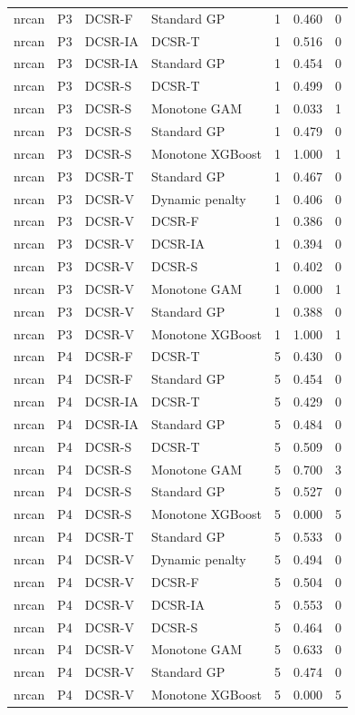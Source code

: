 \begin{tabular}{llllrrr}
nrcan & P3 & DCSR-F & Standard GP & 1 & 0.460 & 0 \\
nrcan & P3 & DCSR-IA & DCSR-T & 1 & 0.516 & 0 \\
nrcan & P3 & DCSR-IA & Standard GP & 1 & 0.454 & 0 \\
nrcan & P3 & DCSR-S & DCSR-T & 1 & 0.499 & 0 \\
nrcan & P3 & DCSR-S & Monotone GAM & 1 & 0.033 & 1 \\
nrcan & P3 & DCSR-S & Standard GP & 1 & 0.479 & 0 \\
nrcan & P3 & DCSR-S & Monotone XGBoost & 1 & 1.000 & 1 \\
nrcan & P3 & DCSR-T & Standard GP & 1 & 0.467 & 0 \\
nrcan & P3 & DCSR-V & Dynamic penalty & 1 & 0.406 & 0 \\
nrcan & P3 & DCSR-V & DCSR-F & 1 & 0.386 & 0 \\
nrcan & P3 & DCSR-V & DCSR-IA & 1 & 0.394 & 0 \\
nrcan & P3 & DCSR-V & DCSR-S & 1 & 0.402 & 0 \\
nrcan & P3 & DCSR-V & Monotone GAM & 1 & 0.000 & 1 \\
nrcan & P3 & DCSR-V & Standard GP & 1 & 0.388 & 0 \\
nrcan & P3 & DCSR-V & Monotone XGBoost & 1 & 1.000 & 1 \\
nrcan & P4 & DCSR-F & DCSR-T & 5 & 0.430 & 0 \\
nrcan & P4 & DCSR-F & Standard GP & 5 & 0.454 & 0 \\
nrcan & P4 & DCSR-IA & DCSR-T & 5 & 0.429 & 0 \\
nrcan & P4 & DCSR-IA & Standard GP & 5 & 0.484 & 0 \\
nrcan & P4 & DCSR-S & DCSR-T & 5 & 0.509 & 0 \\
nrcan & P4 & DCSR-S & Monotone GAM & 5 & 0.700 & 3 \\
nrcan & P4 & DCSR-S & Standard GP & 5 & 0.527 & 0 \\
nrcan & P4 & DCSR-S & Monotone XGBoost & 5 & 0.000 & 5 \\
nrcan & P4 & DCSR-T & Standard GP & 5 & 0.533 & 0 \\
nrcan & P4 & DCSR-V & Dynamic penalty & 5 & 0.494 & 0 \\
nrcan & P4 & DCSR-V & DCSR-F & 5 & 0.504 & 0 \\
nrcan & P4 & DCSR-V & DCSR-IA & 5 & 0.553 & 0 \\
nrcan & P4 & DCSR-V & DCSR-S & 5 & 0.464 & 0 \\
nrcan & P4 & DCSR-V & Monotone GAM & 5 & 0.633 & 0 \\
nrcan & P4 & DCSR-V & Standard GP & 5 & 0.474 & 0 \\
nrcan & P4 & DCSR-V & Monotone XGBoost & 5 & 0.000 & 5 \\
\bottomrule
\end{tabular}
